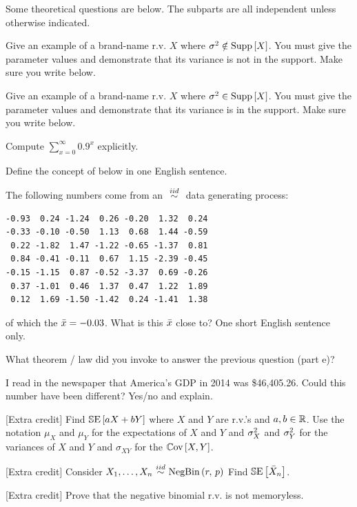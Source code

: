 \documentclass[12pt]{article}
\begin{document}
\problem Some theoretical questions are below. The subparts are all independent unless otherwise indicated.\\

\benum

 Give an example of a brand-name r.v. $X$ where $\sigma^2 \notin \text{Supp}\left[X\right]$. You must give the parameter values and demonstrate that its variance is not in the support. Make sure you write  below. 

 Give an example of a brand-name r.v. $X$ where $\sigma^2 \in \text{Supp}\left[X\right]$. You must give the parameter values and demonstrate that its variance is in the support. Make sure you write  below. 

 Compute $\displaystyle \sum_{x=0}^\infty 0.9^x$ explicitly. 

 Define the concept of  below in one English sentence. 

 The following numbers come from an $\iid$ data generating process: 

\begin{verbatim}
-0.93  0.24 -1.24  0.26 -0.20  1.32  0.24 
-0.33 -0.10 -0.50  1.13  0.68  1.44 -0.59  
 0.22 -1.82  1.47 -1.22 -0.65 -1.37  0.81  
 0.84 -0.41 -0.11  0.67  1.15 -2.39 -0.45 
-0.15 -1.15  0.87 -0.52 -3.37  0.69 -0.26  
 0.37 -1.01  0.46  1.37  0.47  1.22  1.89  
 0.12  1.69 -1.50 -1.42  0.24 -1.41  1.38
\end{verbatim}

of which the $\bar{x} = -0.03$. What is this $\bar{x}$ close to? One short English sentence only. 


 What theorem / law did you invoke to answer the previous question (part e)? 

 I read in the newspaper that America's GDP in 2014 was \$46,405.26. Could this number have been different? Yes/no and explain. 

 [Extra credit] Find $\mathbb{S}\text{E}\left[aX + bY\right]$ where $X$ and $Y$ are r.v.'s and $a,b \in \mathbb{R}$. Use the notation $\mu_X$ and $\mu_Y$ for the expectations of $X$ and $Y$ and $\sigma^2_X$ and $\sigma^2_Y$ for the variances of $X$ and $Y$ and $\sigma_{XY}$ for the $\mathbb{C}\text{ov}\left[X, Y\right]$.

 [Extra credit] Consider $\Xoneton \iid \negbin{r}{p}$ Find $\mathbb{S}\text{E}\left[\bar{X}_n\right]$. 

 [Extra credit] Prove that the negative binomial r.v. is not memoryless. 

\eenum
\end{document}
